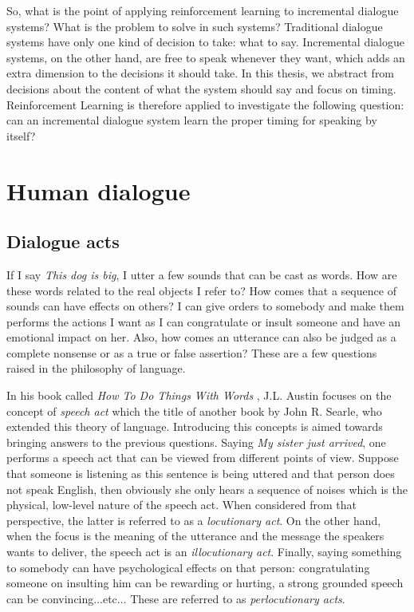         So, what is the point of applying reinforcement learning to incremental dialogue systems? What is the problem to solve in such systems? Traditional dialogue systems have only one kind of decision to take: what to say. Incremental dialogue systems, on the other hand, are free to speak whenever they want, which adds an extra dimension to the decisions it should take. In this thesis, we abstract from decisions about the content of what the system should say and focus on timing. Reinforcement Learning is therefore applied to investigate the following question: can an incremental dialogue system learn the proper timing for speaking by itself?

\section{Human dialogue}
	\subsection{Dialogue acts}
    \label{soa:dialogueacts}
    
    	If I say \textit{This dog is big}, I utter a few sounds that can be cast as words. How are these words related to the real objects I refer to? How comes that a sequence of sounds can have effects on others? I can give orders to somebody and make them performs the actions I want as I can congratulate or insult someone and have an emotional impact on her. Also, how comes an utterance can also be judged as a complete nonsense or as a true or false assertion? These are a few questions raised in the philosophy of language.
    
    	In his book called \textit{How To Do Things With Words} \cite{Austin1962}, J.L. Austin focuses on the concept of \textit{speech act} which the title of another book \cite{Searle1969} by John R. Searle, who extended this theory of language. Introducing this concepts is aimed towards bringing answers to the previous questions. Saying \textit{My sister just arrived}, one performs a speech act that can be viewed from different points of view. Suppose that someone is listening as this sentence is being uttered and that person does not speak English, then obviously she only hears a sequence of noises which is the physical, low-level nature of the speech act. When considered from that perspective, the latter is referred to as a \textit{locutionary act}. On the other hand, when the focus is the meaning of the utterance and the message the speakers wants to deliver, the speech act is an \textit{illocutionary act}. Finally, saying something to somebody can have psychological effects on that person: congratulating someone on insulting him can be rewarding or hurting, a strong grounded speech can be convincing...etc... These are referred to as \textit{perlocutionary acts}.
			
